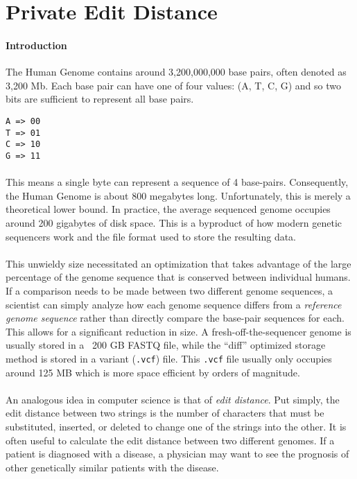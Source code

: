 \pagebreak
\section{Private Edit Distance}

\paragraph{Introduction}
The Human Genome contains around 3,200,000,000 base pairs, often denoted as 3,200 Mb. Each base pair can have one of four values: (A, T, C, G) and so two bits are sufficient to represent all base pairs.

\begin{verbatim}
A => 00
T => 01
C => 10
G => 11
\end{verbatim}

\paragraph{}
This means a single byte can represent a sequence of 4 base-pairs. Consequently, the Human Genome is about 800 megabytes long. Unfortunately, this is merely a theoretical lower bound. In practice, the average sequenced genome occupies around 200 gigabytes of disk space. This is a byproduct of how modern genetic sequencers work and the file format used to store the resulting data.

\paragraph{}
This unwieldy size necessitated an optimization that takes advantage of the large percentage of the genome sequence that is conserved between individual humans. If a comparison needs to be made between two different genome sequences, a scientist can simply analyze how each genome sequence differs from a \textit{reference genome sequence} rather than directly compare the base-pair sequences for each. This allows for a significant reduction in size. A fresh-off-the-sequencer genome is usually stored in a ~200 GB FASTQ file, while the ``diff'' optimized storage method is stored in a variant (\texttt{.vcf}) file. This \texttt{.vcf} file usually only occupies around 125 MB which is more space efficient by orders of magnitude.

\paragraph{}
An analogous idea in computer science is that of \textit{edit distance}. Put simply, the edit distance between two strings is the number of characters that must be substituted, inserted, or deleted to change one of the strings into the other. It is often useful to calculate the edit distance between two different genomes. If a patient is diagnosed with a disease, a physician may want to see the prognosis of other genetically similar patients with the disease.

